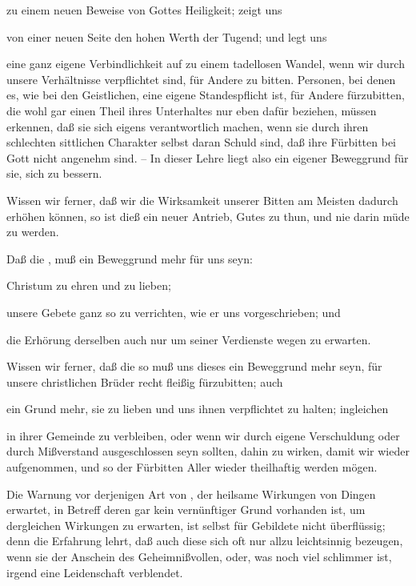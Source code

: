 \begin{aufza}
\begin{aufzb}
\item zu einem neuen Beweise von Gottes Heiligkeit; zeigt uns
\item von einer neuen Seite den hohen Werth der Tugend; und legt uns
\item eine ganz eigene Verbindlichkeit auf zu einem tadellosen Wandel, wenn wir durch unsere Verhältnisse verpflichtet sind, für Andere zu bitten. Personen, bei denen es, wie bei den Geistlichen, eine eigene Standespflicht ist, für Andere fürzubitten, die wohl gar einen Theil ihres Unterhaltes nur eben dafür beziehen, müssen erkennen, daß sie sich eigens verantwortlich machen, wenn sie durch ihren schlechten sittlichen Charakter selbst daran Schuld sind, daß ihre Fürbitten bei Gott nicht angenehm sind. -- In dieser Lehre liegt also ein eigener Beweggrund für sie, sich zu bessern.~
\end{aufzb}
\item Wissen wir ferner, daß wir die Wirksamkeit unserer Bitten am Meisten dadurch erhöhen können,  so ist dieß ein neuer Antrieb, Gutes zu thun, und nie darin müde zu werden.
\item Daß die , muß ein Beweggrund mehr für uns seyn:
\begin{aufzb}
\item Christum zu ehren und zu lieben;
\item unsere Gebete ganz so zu verrichten, wie er uns vorgeschrieben; und
\item die Erhörung derselben auch nur um seiner Verdienste wegen zu erwarten.
\item Wissen wir ferner, daß die  so muß uns dieses ein Beweggrund mehr seyn, für unsere christlichen Brüder recht fleißig fürzubitten; auch
\item ein Grund mehr, sie zu lieben und uns ihnen verpflichtet zu halten; ingleichen
\item in ihrer Gemeinde zu verbleiben, oder wenn wir durch eigene Verschuldung oder durch Mißverstand ausgeschlossen seyn sollten, dahin zu wirken, damit wir wieder aufgenommen, und so der Fürbitten Aller wieder theilhaftig werden mögen.
\end{aufzb}
\item Die Warnung vor derjenigen Art von , der heilsame Wirkungen von Dingen erwartet, in Betreff deren gar kein vernünftiger Grund vorhanden ist, um dergleichen Wirkungen zu erwarten, ist selbst für Gebildete nicht überflüssig; denn die Erfahrung lehrt, daß auch diese sich oft nur allzu leichtsinnig bezeugen, wenn sie der Anschein des Geheimnißvollen, oder, was noch viel schlimmer ist, irgend eine Leidenschaft verblendet.
\end{aufza}

